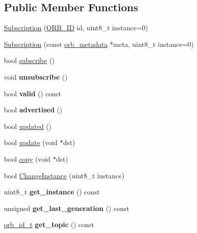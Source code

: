 \subsection*{Public Member Functions}
\begin{DoxyCompactItemize}
\item 
\hyperlink{classuORB_1_1Subscription_a6afd37f8aa13bc3ffeafd29b7a3d434f}{Subscription} (\hyperlink{uORB_8h_a96af5434ec1acdf24287bd7851b0413f}{O\+R\+B\+\_\+\+ID} id, uint8\+\_\+t instance=0)
\item 
\hyperlink{classuORB_1_1Subscription_a8851d25ec7fc746ed71214cb65500006}{Subscription} (const \hyperlink{structorb__metadata}{orb\+\_\+metadata} $\ast$meta, uint8\+\_\+t instance=0)
\item 
bool \hyperlink{classuORB_1_1Subscription_acb0fbd4b56d5e3c8edca15206e110223}{subscribe} ()
\item 
\mbox{\label{classuORB_1_1Subscription_a4228366c28dfaed084710f13e48934be}} 
void {\bfseries unsubscribe} ()
\item 
\mbox{\label{classuORB_1_1Subscription_af4675ee1722445e07e50d1a984b8d8c0}} 
bool {\bfseries valid} () const
\item 
\mbox{\label{classuORB_1_1Subscription_a9c16cd791d522e477bfafbbc09729bc2}} 
bool {\bfseries advertised} ()
\item 
bool \hyperlink{classuORB_1_1Subscription_a788d1848a46abe88a093be9a1f7cb2ca}{updated} ()
\item 
bool \hyperlink{classuORB_1_1Subscription_a2376542413f8b31c20bcbfc1a11b13ea}{update} (void $\ast$dst)
\item 
bool \hyperlink{classuORB_1_1Subscription_a17a37eb5624b409379db434400de4582}{copy} (void $\ast$dst)
\item 
bool \hyperlink{classuORB_1_1Subscription_a47a32a02ea909df267542d4b4ef99115}{Change\+Instance} (uint8\+\_\+t instance)
\item 
\mbox{\label{classuORB_1_1Subscription_ab0c5d9ec0df8e62343413302d6e97fa0}} 
uint8\+\_\+t {\bfseries get\+\_\+instance} () const
\item 
\mbox{\label{classuORB_1_1Subscription_ad7aaf2211cb1a5ec96cdfda9cabac174}} 
unsigned {\bfseries get\+\_\+last\+\_\+generation} () const
\item 
\mbox{\label{classuORB_1_1Subscription_a447b0f0a9e4745f3dcc2bcdf2540d940}} 
\hyperlink{structorb__metadata}{orb\+\_\+id\+\_\+t} {\bfseries get\+\_\+topic} () const
\end{DoxyCompactItemize}
